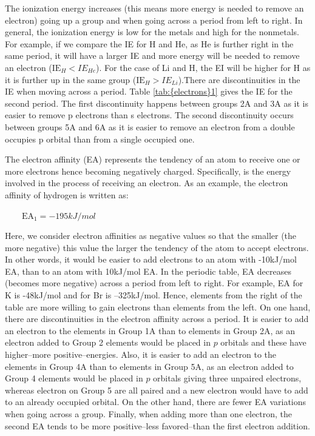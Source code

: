 \documentclass[main.tex]{subfiles}
\newcommand\chapterlabel{electrons}
\begin{document}
\begin{description}
 
The ionization energy increases (this means more energy is needed to remove an electron) going up a group and when going across a period from left to right. In general, the ionization energy is low for the metals and high for the nonmetals. For example, if we compare the IE for H and He, as He is further right in the same period, it will have a larger IE and more energy will be needed to remove an electron ($\text{IE}_{H}<IE_{He}$). For the case of Li and H, the EI will be higher for H as it is further up in the same group ($\text{IE}_{H}>IE_{Li}$).There are discontinuities in the IE when moving across a period. Table \ref{tab:{\chapterlabel}1} gives the IE for the second period. The first discontinuity happens between groups 2A and 3A as it is easier to remove p electrons than s electrons. The second discontinuity occurs between groups 5A and 6A as it is easier to remove an electron from a double occupies p orbital than from a single occupied one.
\item[\docfilehook{Electron affinity}{}] 
The electron affinity (EA) represents the tendency of an atom to receive one or more electrons hence becoming negatively charged.  Specifically, is the energy involved in the process of receiving an electron. As an example, the electron affinity of hydrogen is written as:
\begin{center} $\qquad   \text{EA}_1= -195kJ/mol$  \end{center}
Here, we consider electron affinities as negative values so that the smaller (the more negative) this value the larger the tendency of the atom to accept electrons. In other words, it would be easier to add electrons to an atom with -10kJ/mol EA, than to an atom with 10kJ/mol EA. In the periodic table, EA decreases (becomes more negative) across a period from left to right. For example, EA for K is -48kJ/mol and for Br is --325kJ/mol. Hence, elements from the right of the table are more willing to gain electrons than elements from the left. On one hand, there are discontinuities in the electron affinity across a period. It is easier to add an electron to the elements in Group 1A than to elements in Group 2A, as an electron added to Group 2 elements would be placed in $p$ orbitals and these have higher--more positive--energies. Also, it is easier to add an electron to the elements in Group 4A than to elements in Group 5A, as an electron added to Group 4 elements would be placed in $p$ orbitals giving three unpaired electrons, whereas electron on Group 5 are all paired and a new electron would have to add to an already occupied orbital. On the other hand, there are fewer EA variations when going across a group. Finally, when adding more than one electron, the second EA tends to be more positive--less favored--than the first electron addition.
       \label{Fig:{\chapterlabel}\thefigurenewcounter}
 \vspace{0cm}\hspace{0cm}\begin{minipage}[b]{1.5\linewidth}


\end{minipage}
\end{description}
\end{document}
